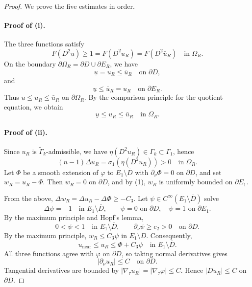 \documentclass[reqno,a4paper]{amsart}
\numberwithin{equation}{section}
\begin{document}
	\begin{proof}
		We prove the five estimates in order.
		
		\paragraph{Proof of (i).} 
		The three functions satisfy
		\[
		F(D^2 \underline{u}) \ge 1 = F(D^2 u_R) = F(D^2 \bar{u}_R) \quad \text{in } \Omega_R.
		\]
		On the boundary $\partial \Omega_R = \partial D \cup \partial E_R$, we have
		\begin{equation}
			\underline{u} = u_R \le \bar{u}_R \quad \text{on } \partial D,
		\end{equation}
		and
		\begin{equation}
			\underline{u} \le \bar{u}_R = u_R \quad \text{on } \partial E_R.
		\end{equation}
		Thus $\underline{u} \le u_R \le \bar{u}_R$ on $\partial \Omega_R$. By the comparison principle for the quotient equation, we obtain
		\begin{equation}
			\underline{u} \le u_R \le \bar{u}_R \quad \text{in } \Omega_R.
		\end{equation}
		
		\paragraph{Proof of (ii).}
		Since $u_R$ is $\widetilde{\Gamma}_k$-admissible, we have $\eta(D^2 u_R) \in \Gamma_k \subset \Gamma_1$, hence
		\begin{equation}
			(n-1)\Delta u_R = \sigma_1(\eta(D^2 u_R)) > 0 \quad \text{in } \Omega_R.
		\end{equation}
		Let $\Phi$ be a smooth extension of $\varphi$ to $E_1 \setminus \overline{D}$ with $\partial_\nu \Phi = 0$ on $\partial D$, and set $w_R = u_R - \Phi$. Then $w_R = 0$ on $\partial D$, and by (1), $w_R$ is uniformly bounded on $\partial E_1$.
		
		From the above, $\Delta w_R = \Delta u_R - \Delta \Phi \ge -C_3$. Let $\psi \in C^\infty(E_1 \setminus \overline{D})$ solve
		\[
		\Delta \psi = -1 \quad \text{in } E_1 \setminus \overline{D}, \qquad
		\psi = 0 \text{ on } \partial D, \quad \psi = 1 \text{ on } \partial E_1.
		\]
		By the maximum principle and Hopf's lemma,
		\[
		0 < \psi < 1 \quad \text{in } E_1 \setminus \overline{D}, \qquad
		\partial_\nu \psi \ge c_2 > 0 \quad \text{on } \partial D.
		\]
		By the maximum principle, $w_R \le C_3 \psi$ in $E_1 \setminus \overline{D}$. Consequently,
		\[
		u_{\mathrm{near}} \le u_R \le \Phi + C_3 \psi \quad \text{in } E_1 \setminus \overline{D}.
		\]
		All three functions agree with $\varphi$ on $\partial D$, so taking normal derivatives gives
		\begin{equation}
			|\partial_\nu u_R| \le C \quad \text{on } \partial D.
		\end{equation}
		Tangential derivatives are bounded by $|\nabla_\tau u_R| = |\nabla_\tau \varphi| \le C$. Hence $|Du_R| \le C$ on $\partial D$.
		

\end{proof}
\end{document}
